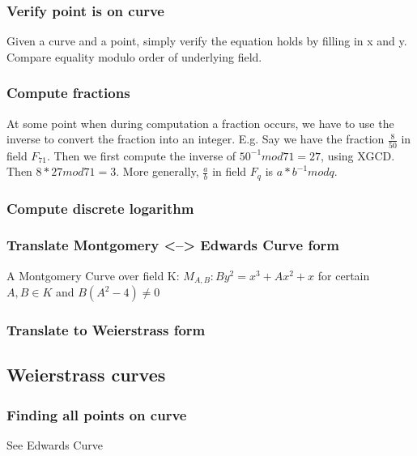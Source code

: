 \documentclass{article}
\begin{document}

\subsubsection{Verify point is on curve}
Given a curve and a point, simply verify the equation holds by filling in x and y.
Compare equality modulo order of underlying field.

\subsubsection{Compute fractions}
At some point when during computation a fraction occurs, we have to use the inverse to convert the fraction into an integer.
E.g. Say we have the fraction $\frac{8}{50}$ in field $F_{71}$. Then we first compute the inverse of $50^{-1} mod 71 = 27$, using XGCD. Then $8*27 mod 71 = 3$. More generally, $\frac{a}{b}$ in field $F_q$ is $a*b^{-1} mod q$.

\subsubsection{Compute discrete logarithm}


\subsubsection{Translate Montgomery <--> Edwards Curve form}
A Montgomery Curve over field K: $M_{A,B}: By^2 = x^3 + Ax^2 + x$ for certain $A,B \in K$ and $B(A^2 - 4) \not= 0$



\subsubsection{Translate to Weierstrass form}

\subsection{Weierstrass curves}
\subsubsection{Finding all points on curve}
See Edwards Curve
\end{document}
